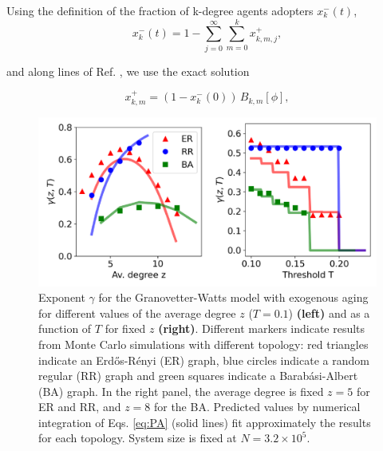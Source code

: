 Using the definition of the fraction of k-degree agents adopters $x^{-}_{k} (t)$,
\begin{equation}
    x^{-}_{k}(t) = 1 - \sum_{j=0}^{\infty} \sum_{m = 0}^k x^{+}_{k,m,j},
\end{equation}

and along lines of Ref. \cite{gleeson-2013}, we use the exact solution

\begin{equation}
    x^{+}_{k,m} = (1 - x^{-}_{k} (0)) \, B_{k,m}[\phi],
\end{equation}

\begin{figure}
    \centering \captionsetup{font=sf}
    \includegraphics[width=0.7\columnwidth]{Figs/Aging_Threshold/EXO.pdf}
    \caption[Exponent $\gamma$ for the Granovetter-Watts model with exogenous aging]{\label{fig:exo_exp} Exponent $\gamma$ for the Granovetter-Watts model with exogenous aging for different values of the average degree $z$ ($T = 0.1$) \textbf{(left)} and as a function of  $T$ for fixed $z$ \textbf{(right)}. Different markers indicate results from Monte Carlo simulations with different topology: red triangles indicate an Erd\H{o}s-R\'enyi (ER) graph, blue circles indicate a random regular (RR) graph and green squares indicate a Barab\'asi-Albert (BA) graph. In the right panel, the average degree is fixed $z = 5$ for ER and RR, and $z = 8$ for the BA. Predicted values by numerical integration of Eqs. \eqref{eq:PA} (solid lines) fit approximately the results for each topology. System size is fixed at $N = 3.2 \times 10^5$.}
    \end{figure}

